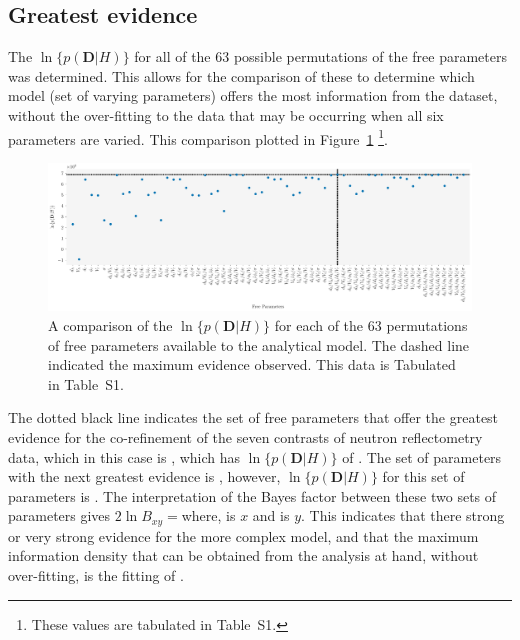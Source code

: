\documentclass[%
 reprint,
 superscriptaddress,
 amsmath,amssymb,
 aps,
]{revtex4-1}
\begin{document}
\subsection{Greatest evidence}
The $\ln\{p(\mathbf{D}|H)\}$ for all of the \num{63} possible permutations of the free parameters was determined.
This allows for the comparison of these to determine which model (set of varying parameters) offers the most information from the dataset, without the over-fitting to the data that may be occurring when all six parameters are varied. 
This comparison plotted in Figure~\ref{fig:evidence} \footnote{These values are tabulated in Table~S1.}. 
%
\begin{figure}
\includegraphics[width=\textwidth]{evidence}
\caption{\label{fig:evidence} A comparison of the $\ln\{p(\mathbf{D}|H)\}$ for each of the \num{63} permutations of free parameters available to the analytical model. The dashed line indicated the maximum evidence observed. This data is Tabulated in Table~S1.}
\end{figure}
%
The dotted black line indicates the set of free parameters that offer the greatest evidence for the co-refinement of the seven contrasts of neutron reflectometry data, which in this case is \unskip, which has $\ln\{p(\mathbf{D}|H)\}$ of \unskip. 
The set of parameters with the next greatest evidence is \unskip, however, $\ln\{p(\mathbf{D}|H)\}$ for this set of parameters is \unskip.
The interpretation of the Bayes factor between these two sets of parameters gives $2\ln{B_{xy}}=$\unskip\;where, \unskip\;is $x$ and \unskip\;is $y$. 
This indicates that there strong or very strong evidence for the more complex model, and that the maximum information density that can be obtained from the analysis at hand, without over-fitting, is the fitting of \unskip. 
\end{document}
